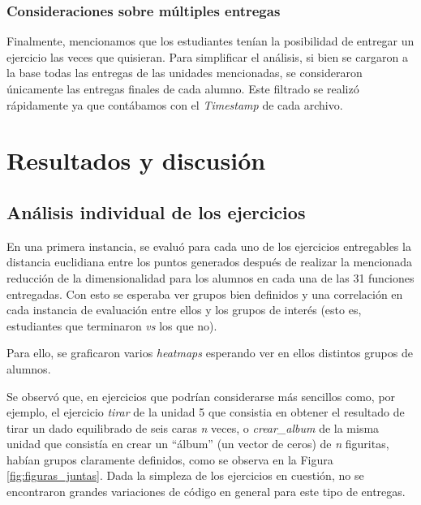 \documentclass[11pt,a4paper,twoside,openany]{tesis}
\begin{document}
\subsection{Consideraciones sobre múltiples entregas}

Finalmente, mencionamos que los estudiantes tenían la posibilidad de entregar un ejercicio las veces que quisieran. Para simplificar el análisis, si bien se cargaron a la base todas las entregas de las unidades mencionadas, se consideraron únicamente las entregas finales de cada alumno. Este filtrado se realizó rápidamente ya que contábamos con el \emph{Timestamp} de cada archivo.


\chapter{Resultados y discusión}
\section{Análisis individual de los ejercicios}

En una primera instancia, se evaluó para cada uno de los ejercicios entregables la distancia euclidiana entre los puntos generados después de realizar la mencionada reducción de la dimensionalidad para los alumnos en cada una de las 31 funciones entregadas. Con esto se esperaba ver grupos bien definidos y una correlación en cada instancia de evaluación entre ellos y los grupos de interés (esto es, estudiantes que terminaron \emph{vs} los que no). 

Para ello, se graficaron varios \emph{heatmaps} esperando ver en ellos distintos grupos de alumnos. 

Se observó que, en ejercicios que podrían considerarse más sencillos como, por ejemplo, el ejercicio \emph{tirar} de la unidad 5 que consistia en obtener el resultado de tirar un dado equilibrado de seis caras \emph{n} veces, o \emph{crear\_album} de la misma unidad que consistía en crear un ``álbum'' (un vector de ceros) de \emph{n} figuritas, habían grupos claramente definidos, como se observa en la Figura \ref{fig:figuras_juntas}. Dada la simpleza de los ejercicios en cuestión, no se encontraron grandes variaciones de código en general para este tipo de entregas. 
\end{document}

